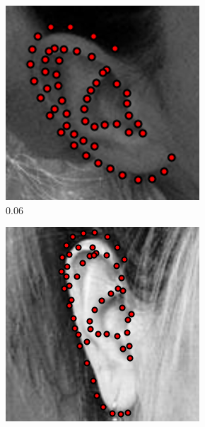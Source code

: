 \begin{figure}[t!]
\centering
    \begin{subfigure}[b]{0.115\textwidth}
            \includegraphics[height=1\textwidth]{resources/Fig_Alignment/ear_06_55}
    \caption{$0.06$}
    \end{subfigure}
    \begin{subfigure}[b]{0.115\textwidth}
            \includegraphics[height=1\textwidth]{resources/Fig_Alignment/ear_1_55}

\end{subfigure}
\end{figure}
